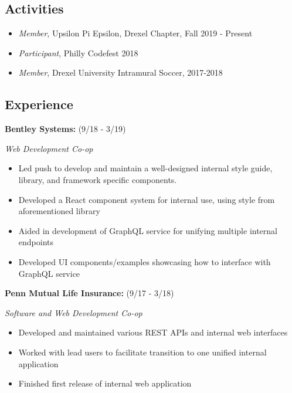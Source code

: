 \documentclass[10pt]{article}
\begin{document}
\begin{multicols}{2}
\subsection*{Activities}%
\label{sub:Activities}

\begin{itemize}
\setlength\itemsep{0.5em}
\item \emph{Member}, Upsilon Pi Epsilon, Drexel Chapter, Fall 2019 - Present
\item \emph{Participant}, Philly Codefest 2018
\item \emph{Member}, Drexel University Intramural Soccer, 2017-2018
\end{itemize}

\vfill\null
\columnbreak

\subsection*{Experience}%
\label{sub:Experience}

\textbf{Bentley Systems:} (9/18 - 3/19)

\emph{Web Development Co-op}

\begin{itemize}
\setlength\itemsep{0.5em}
\item Led push to develop and maintain a well-designed internal style
	guide, library, and framework specific components.
\item  Developed a React component system for internal use, using style
	from aforementioned library
\item Aided in development of GraphQL service for unifying
multiple internal endpoints
\item Developed UI components/examples showcasing how to
interface with GraphQL service
\end{itemize}

\textbf{Penn Mutual Life Insurance:} (9/17 - 3/18)

\emph{Software and Web Development Co-op}

\begin{itemize}
\setlength\itemsep{0.5em}
\item Developed and maintained various REST APIs and internal web interfaces
\item Worked with lead users to facilitate transition to one unified
	internal application
\item Finished first release of internal web application
\end{itemize}


\end{multicols}
\end{document}
